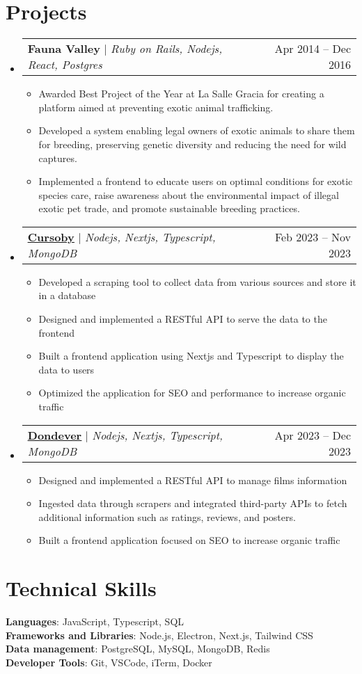 \documentclass[letterpaper,11pt]{article}
\makeatletter
\newcommand{\resumeItem}[1]{
  \item\small{
    {#1 \vspace{-2pt}}
  }
}
\newcommand{\resumeProjectHeading}[2]{
    \item
    \begin{tabular*}{0.97\textwidth}{l@{\extracolsep{\fill}}r}
      \small#1 & #2 \\
    \end{tabular*}\vspace{-7pt}
}
\newcommand{\resumeSubHeadingListStart}{\begin{itemize}[leftmargin=0.15in, label={}]}
\newcommand{\resumeSubHeadingListEnd}{\end{itemize}}
\newcommand{\resumeItemListStart}{\begin{itemize}}
\newcommand{\resumeItemListEnd}{\end{itemize}\vspace{-5pt}}
\makeatother
\begin{document}
\section{Projects}
    \resumeSubHeadingListStart
      \resumeProjectHeading
          {\textbf{Fauna Valley}  $|$ \emph{Ruby on Rails, Nodejs, React, Postgres}}{Apr 2014 -- Dec 2016}
          \resumeItemListStart
            \resumeItem{Awarded Best Project of the Year at La Salle Gracia for creating a platform aimed at preventing exotic animal trafficking.}
            \resumeItem{Developed a system enabling legal owners of exotic animals to share them for breeding, preserving genetic diversity and reducing the need for wild captures.}
            \resumeItem{Implemented a frontend to educate users on optimal conditions for exotic species care, raise awareness about the environmental impact of illegal exotic pet trade, and promote sustainable breeding practices.}
          \resumeItemListEnd
      \resumeProjectHeading
          {\textbf{\href{https://cursoby.com}{\underline{Cursoby}}}  $|$ \emph{Nodejs, Nextjs, Typescript, MongoDB}}{Feb 2023 -- Nov 2023}
          \resumeItemListStart
            \resumeItem{Developed a scraping tool to collect data from various sources and store it in a database}
            \resumeItem{Designed and implemented a RESTful API to serve the data to the frontend}
            \resumeItem{Built a frontend application using Nextjs and Typescript to display the data to users}
            \resumeItem{Optimized the application for SEO and performance to increase organic traffic}
          \resumeItemListEnd
      \resumeProjectHeading
          {\textbf{\href{https://dondever.com}{\underline{Dondever}}}  $|$ \emph{Nodejs, Nextjs, Typescript, MongoDB}}{Apr 2023 -- Dec 2023}
          \resumeItemListStart
            \resumeItem{Designed and implemented a RESTful API to manage films information}
            \resumeItem{Ingested data through scrapers and integrated third-party APIs to fetch additional information such as ratings, reviews, and posters.}
            \resumeItem{Built a frontend application focused on SEO to increase organic traffic}
          \resumeItemListEnd

    \resumeSubHeadingListEnd

\section{Technical Skills}
 \begin{itemize}[leftmargin=0.15in, label={}]
    \small{\item{
     \textbf{Languages}{: JavaScript, Typescript, SQL} \\
     \textbf{Frameworks and Libraries}{: Node.js, Electron, Next.js, Tailwind CSS} \\
     \textbf{Data management}{: PostgreSQL, MySQL, MongoDB, Redis} \\
     \textbf{Developer Tools}{: Git, VSCode, iTerm, Docker} \\
    }}
 \end{itemize}

\end{document}
